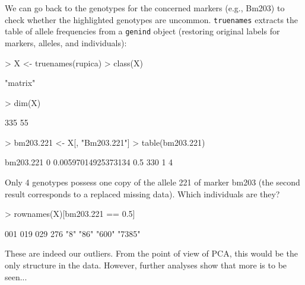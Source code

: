 \documentclass{article}
\begin{document}
\noindent We can go back to the genotypes for the concerned markers (e.g.,
Bm203) to check whether the highlighted genotypes are uncommon.
\texttt{truenames} extracts the table of allele frequencies from a
\texttt{genind} object (restoring original labels for markers, alleles, and individuals):
\begin{Schunk}
\begin{Sinput}
> X <- truenames(rupica)
> class(X)
\end{Sinput}
\begin{Soutput}
[1] "matrix"
\end{Soutput}
\begin{Sinput}
> dim(X)
\end{Sinput}
\begin{Soutput}
[1] 335  55
\end{Soutput}
\begin{Sinput}
> bm203.221 <- X[, "Bm203.221"]
> table(bm203.221)
\end{Sinput}
\begin{Soutput}
bm203.221
                  0 0.00597014925373134                 0.5 
                330                   1                   4 
\end{Soutput}
\end{Schunk}
Only 4 genotypes possess one copy of the allele 221 of marker bm203 (the second result
corresponds to a replaced missing data).
Which individuals are they?
\begin{Schunk}
\begin{Sinput}
> rownames(X)[bm203.221 == 0.5]
\end{Sinput}
\begin{Soutput}
   001    019    029    276 
   "8"   "86"  "600" "7385" 
\end{Soutput}
\end{Schunk}
These are indeed our outliers.
From the point of view of PCA, this would be the only structure in the data.
However, further analyses show that more is to be seen...
\\






\end{document}
